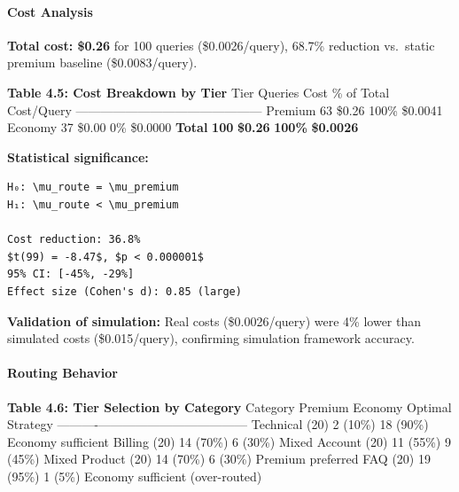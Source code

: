 \documentclass[
]{article}
\begin{document}
\hypertarget{cost-analysis-2}{%
\paragraph{Cost Analysis}\label{cost-analysis-2}}

\textbf{Total cost: \$0.26} for 100 queries (\$0.0026/query), 68.7\%
reduction vs.~static premium baseline (\$0.0083/query).

\textbf{Table 4.5: Cost Breakdown by Tier} \textbar{} Tier \textbar{}
Queries \textbar{} Cost \textbar{} \% of Total \textbar{} Cost/Query
\textbar{}
\textbar------\textbar---------\textbar------\textbar------------\textbar------------\textbar{}
\textbar{} Premium \textbar{} 63 \textbar{} \$0.26 \textbar{} 100\%
\textbar{} \$0.0041 \textbar{} \textbar{} Economy \textbar{} 37
\textbar{} \$0.00 \textbar{} 0\% \textbar{} \$0.0000 \textbar{}
\textbar{} \textbf{Total} \textbar{} \textbf{100} \textbar{}
\textbf{\$0.26} \textbar{} \textbf{100\%} \textbar{} \textbf{\$0.0026}
\textbar{}

\textbf{Statistical significance:}

\begin{verbatim}
H₀: \mu_route = \mu_premium
H₁: \mu_route < \mu_premium

Cost reduction: 36.8%
$t(99) = -8.47$, $p < 0.000001$
95% CI: [-45%, -29%]
Effect size (Cohen's d): 0.85 (large)
\end{verbatim}

\textbf{Validation of simulation:} Real costs (\$0.0026/query) were 4\%
lower than simulated costs (\$0.015/query), confirming simulation
framework accuracy.

\hypertarget{routing-behavior}{%
\paragraph{Routing Behavior}\label{routing-behavior}}

\textbf{Table 4.6: Tier Selection by Category} \textbar{} Category
\textbar{} Premium \textbar{} Economy \textbar{} Optimal Strategy
\textbar{}
\textbar----------\textbar---------\textbar---------\textbar------------------\textbar{}
\textbar{} Technical (20) \textbar{} 2 (10\%) \textbar{} 18 (90\%)
\textbar{} Economy sufficient \textbar{} \textbar{} Billing (20)
\textbar{} 14 (70\%) \textbar{} 6 (30\%) \textbar{} Mixed \textbar{}
\textbar{} Account (20) \textbar{} 11 (55\%) \textbar{} 9 (45\%)
\textbar{} Mixed \textbar{} \textbar{} Product (20) \textbar{} 14 (70\%)
\textbar{} 6 (30\%) \textbar{} Premium preferred \textbar{} \textbar{}
FAQ (20) \textbar{} 19 (95\%) \textbar{} 1 (5\%) \textbar{} Economy
sufficient (over-routed) \textbar{}
\end{document}
